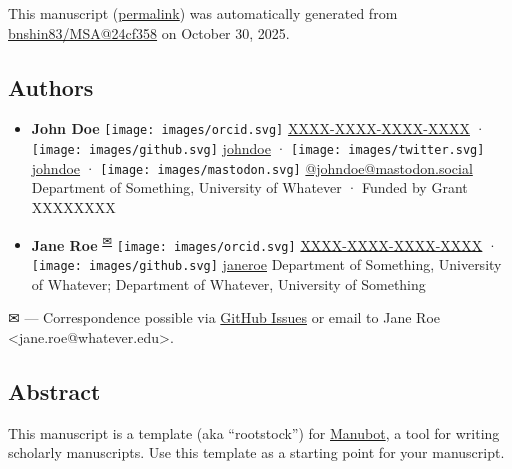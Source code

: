 This manuscript
(\href{https://bnshin83.github.io/MSA/v/24cf3587b72e9643bcbd11ad4920de5873b48b36/}{permalink})
was automatically generated
from \href{https://github.com/bnshin83/MSA/tree/24cf3587b72e9643bcbd11ad4920de5873b48b36}{bnshin83/MSA@24cf358}
on October 30, 2025.

\hypertarget{authors}{%
\subsection{Authors}\label{authors}}

\begin{itemize}
\item
  \textbf{John Doe}
  \texttt{[image: images/orcid.svg]}
  \href{https://orcid.org/XXXX-XXXX-XXXX-XXXX}{XXXX-XXXX-XXXX-XXXX}
  · \texttt{[image: images/github.svg]}
  \href{https://github.com/johndoe}{johndoe}
  · \texttt{[image: images/twitter.svg]}
  \href{https://twitter.com/johndoe}{johndoe}
  · \texttt{[image: images/mastodon.svg]}
  \href{https://mastodon.social/@johndoe}{@johndoe@mastodon.social}
  Department of Something, University of Whatever
  · Funded by Grant XXXXXXXX
\item
  \textbf{Jane Roe}
  \textsuperscript{\protect\hyperlink{correspondence}{✉}}
  \texttt{[image: images/orcid.svg]}
  \href{https://orcid.org/XXXX-XXXX-XXXX-XXXX}{XXXX-XXXX-XXXX-XXXX}
  · \texttt{[image: images/github.svg]}
  \href{https://github.com/janeroe}{janeroe}
  Department of Something, University of Whatever; Department of Whatever, University of Something
\end{itemize}

\leavevmode{}%
✉ --- Correspondence possible via \href{https://github.com/bnshin83/MSA/issues}{GitHub Issues}
or email to
Jane Roe \textless jane.roe@whatever.edu\textgreater.

\hypertarget{abstract}{%
\subsection{Abstract}\label{abstract}}

This manuscript is a template (aka ``rootstock'') for \href{https://manubot.org/}{Manubot}, a tool for writing scholarly manuscripts.
Use this template as a starting point for your manuscript.

